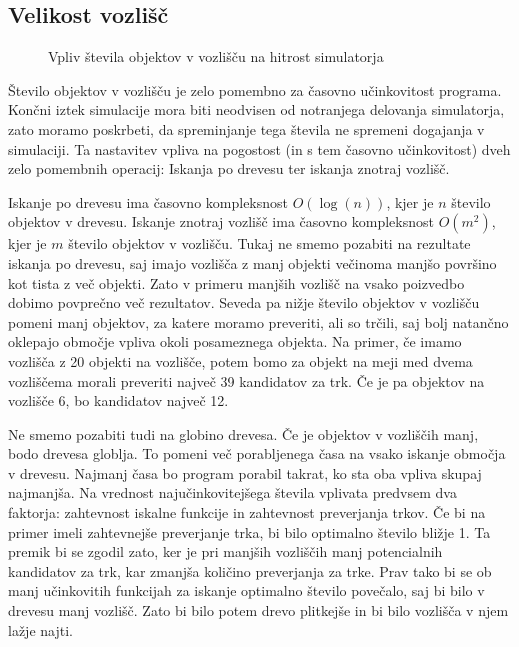 \documentclass[a4paper,12pt]{article}
\begin{document}
\subsection{Velikost vozlišč}

\begin{wrapfigure}{r}{0.5\textwidth}
    \caption{Vpliv števila objektov v vozlišču na hitrost simulatorja}
\end{wrapfigure}

Število objektov v vozlišču je zelo pomembno za časovno učinkovitost programa. Končni iztek simulacije mora
biti neodvisen od notranjega delovanja simulatorja, zato moramo poskrbeti, da spreminjanje tega števila ne spremeni
dogajanja v simulaciji. Ta nastavitev vpliva na pogostost (in s tem časovno učinkovitost) dveh zelo pomembnih operacij:
Iskanja po drevesu ter iskanja znotraj vozlišč.

Iskanje po drevesu ima časovno kompleksnost $O(\log(n))$, kjer je $n$ število objektov v drevesu. Iskanje znotraj vozlišč
ima časovno kompleksnost $O(m^2)$, kjer je $m$ število objektov v vozlišču. Tukaj ne smemo pozabiti na rezultate iskanja po 
drevesu, saj imajo vozlišča z manj objekti večinoma manjšo površino kot tista z več objekti. Zato v primeru manjših vozlišč
na vsako poizvedbo dobimo povprečno več rezultatov. Seveda pa nižje število objektov v vozlišču pomeni manj objektov, za katere
moramo preveriti, ali so trčili, saj bolj natančno oklepajo območje vpliva okoli posameznega objekta. Na primer, če imamo
vozlišča z 20 objekti na vozlišče, potem bomo za objekt na meji med dvema vozliščema morali preveriti največ 39 kandidatov za trk.
Če je pa objektov na vozlišče 6, bo kandidatov največ 12.

Ne smemo pozabiti tudi na globino drevesa. Če je objektov v
vozliščih manj, bodo drevesa globlja. To pomeni več porabljenega časa na vsako iskanje območja v drevesu. Najmanj časa bo program
porabil takrat, ko sta oba vpliva skupaj najmanjša. Na vrednost najučinkovitejšega števila vplivata predvsem dva faktorja: zahtevnost
iskalne funkcije in zahtevnost preverjanja trkov. Če bi na primer imeli zahtevnejše preverjanje trka, bi bilo optimalno število
bližje 1. Ta premik bi se zgodil zato, ker je pri manjših vozliščih manj potencialnih kandidatov za trk, kar
zmanjša količino preverjanja za trke. Prav tako bi se ob manj učinkovitih funkcijah za iskanje optimalno število povečalo, saj
bi bilo v drevesu manj vozlišč. Zato bi bilo potem drevo plitkejše in bi bilo vozlišča v njem lažje najti. 
\end{document}
